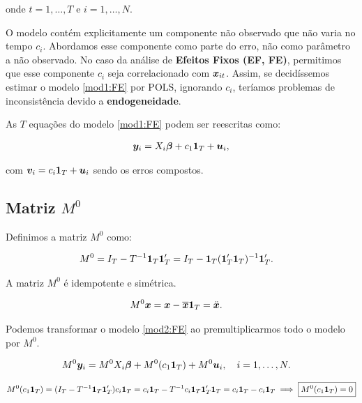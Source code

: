 \documentclass[11pt,oneside,a4paper]{article}
\numberwithin{equation}{section}
\begin{document}
\noindent
onde
$t = 1, \dots, T$ e $i = 1, \dots, N$.

O modelo contém explicitamente um componente não observado que não varia no tempo $c_{i}$.
Abordamos esse componente como parte do erro, não como parâmetro a não observado.
No caso da análise de \textbf{Efeitos Fixos (EF, FE)}, permitimos que esse componente $c_{i}$ seja correlacionado com $\boldsymbol{x}_{it}$.
Assim, se decidíssemos estimar o modelo \eqref{mod1:FE} por POLS, ignorando $c_{i}$, teríamos problemas de inconsistência devido a \textbf{endogeneidade}.

As $T$ equações do modelo \eqref{mod1:FE} podem ser reescritas como:

\vspace{-1 em}
\begin{align} \label{mod2:FE}
	\boldsymbol{y}_{i} = X_{i} \boldsymbol{\beta} + c_{1} \boldsymbol{1}_{T} + \boldsymbol{u}_{i},
\end{align}

\noindent
com
$\boldsymbol{v}_{i} = c_{i} \boldsymbol{1}_{T} + \boldsymbol{u}_{i}$ sendo os erros compostos.

\subsection*{Matriz $M^{0}$}

Definimos a matriz $M^{0}$ como:

\vspace{-1 em}
\begin{align*}
	M^{0} &=
	I_{T} - T^{-1} \boldsymbol{1}_{T} \boldsymbol{1}_{T}'
	=
	I_{T} - \boldsymbol{1}_{T} (\boldsymbol{1}_{T}' \boldsymbol{1}_{T})^{-1} \boldsymbol{1}_{T}'.
\end{align*}

\noindent
A matriz $M^{0}$ é idempotente e simétrica.

\begin{align*}
	M^{0} \boldsymbol{x} &= \boldsymbol{x} - \overline{\boldsymbol{x}} \boldsymbol{1}_{T}
	= \ddot{\boldsymbol{x}}.
\end{align*}

Podemos transformar o modelo \eqref{mod2:FE} ao premultiplicarmos todo o modelo por $M^{0}$.

\vspace{-1 em}
\begin{align*} 
M^{0} \boldsymbol{y}_{i} &= M^{0} X_{i} \boldsymbol{\beta} + M^{0} ( c_{1} \boldsymbol{1}_{T} ) + M^{0} \boldsymbol{u}_{i},
\quad i = 1, \dots, N.
\end{align*}

\vspace{-1 em}
\begin{align*} 
M^{0} ( c_{1} \boldsymbol{1}_{T} ) = 
( I_{T} - T^{-1} \boldsymbol{1}_{T} \boldsymbol{1}_{T}' ) c_{i} \boldsymbol{1}_{T} 
=
c_{i} \boldsymbol{1}_{T} - T^{-1} c_{i} \boldsymbol{1}_{T} \boldsymbol{1}_{T}' \boldsymbol{1}_{T} 
=
c_{i} \boldsymbol{1}_{T} - c_{i} \boldsymbol{1}_{T} 
\implies
\boxed{ M^{0} ( c_{1} \boldsymbol{1}_{T} ) = 0 }
\end{align*}
\end{document}
